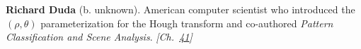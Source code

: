 \textbf{Richard Duda} (b. unknown). American computer scientist who introduced the $(\rho, \theta)$ parameterization for the Hough transform and co-authored \emph{Pattern Classification and Scene Analysis}. \emph{[Ch.~\hyperref[ch:hough]{41}]}

